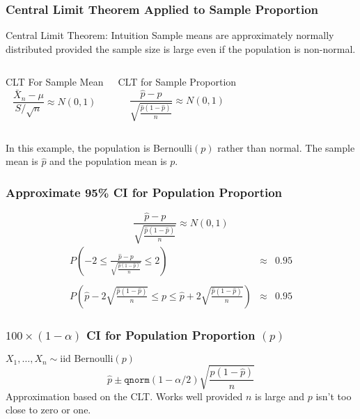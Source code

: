 \begin{frame}
\frametitle{Central Limit Theorem Applied to Sample Proportion}

\begin{alertblock}{Central Limit Theorem: Intuition}
Sample means are approximately normally distributed provided the sample size is large even if the population is non-normal.
\end{alertblock}

\begin{columns}

\begin{block}{CLT For Sample Mean}
  $$\frac{\bar{X}_n -\mu}{S / \sqrt{n}} \approx N(0,1)$$
\end{block}

\begin{block}{CLT for Sample Proportion}
$$\frac{\widehat{p} -p}{\sqrt{\frac{\widehat{p}(1-\widehat{p})}{n}}} \approx N(0,1)$$
\end{block}
\end{columns}

\vspace{1em}
In this example, the population is Bernoulli$(p)$ rather than normal. The sample mean is $\widehat{p}$ and the population mean is $p$.

\end{frame}
\begin{frame}
\frametitle{Approximate 95\% CI for Population Proportion}
$$\frac{\widehat{p} -p}{\sqrt{\frac{\widehat{p}(1-\widehat{p})}{n}}} \approx N(0,1)$$ 
	\begin{eqnarray*}
		P\left(-2 \leq\frac{\widehat{p} -p}{\sqrt{\frac{\widehat{p}(1-\widehat{p})}{n}}} \leq  2\right) &\approx& 0.95\\ \\ 
		P\left(\widehat{p} - 2 \sqrt{\frac{\widehat{p}(1-\widehat{p})}{n}} \leq p \leq \widehat{p} + 2\sqrt{\frac{\widehat{p}(1-\widehat{p})}{n}}\right) &\approx& 0.95
	\end{eqnarray*}
\end{frame}



\begin{frame}
\frametitle{$100\times(1-\alpha)$ CI for Population Proportion $(p)$}
$X_1, \hdots, X_n \sim \mbox{iid Bernoulli}(p)$
	$$\widehat{p} \pm \texttt{qnorm}(1-\alpha/2) \sqrt{\frac{\widehat{p}(1-\widehat{p})}{n}}$$
	\alert{Approximation based on the CLT. Works well provided $n$ is large and $p$ isn't too close to zero or one.}
\end{frame}

